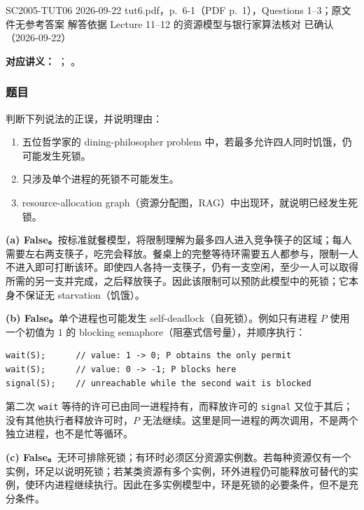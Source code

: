 
\label{tutorial:SC2005-TUT06}

\tutorialmeta
  {SC2005-TUT06}
  {2026-09-22}
  {tut6.pdf，p.~6-1（PDF p.~1），Questions 1--3；原文件无参考答案}
  {解答依据 Lecture 11--12 的资源模型与银行家算法核对}
  {已确认（2026-09-22）}


\textbf{对应讲义：}
；
。

\subsubsection*{题目}

判断下列说法的正误，并说明理由：
\begin{enumerate}[label=(\alph*)]
  \item 五位哲学家的 dining-philosopher problem 中，若最多允许四人同时饥饿，仍可能发生死锁。
  \item 只涉及单个进程的死锁不可能发生。
  \item resource-allocation graph（资源分配图，RAG）中出现环，就说明已经发生死锁。
\end{enumerate}

\begin{checkedsolution}
\nopagebreak[4]
\textbf{(a) False。}按标准就餐模型，将限制理解为最多四人进入竞争筷子的区域；每人需要左右两支筷子，吃完会释放。餐桌上的完整等待环需要五人都参与，限制一人不进入即可打断该环。即使四人各持一支筷子，仍有一支空闲，至少一人可以取得所需的另一支并完成，之后释放筷子。因此该限制可以预防此模型中的死锁；它本身不保证无 starvation（饥饿）。

\textbf{(b) False。}单个进程也可能发生 self-deadlock（自死锁）。例如只有进程 $P$ 使用一个初值为 $1$ 的 blocking semaphore（阻塞式信号量），并顺序执行：
\begin{verbatim}
wait(S);      // value: 1 -> 0; P obtains the only permit
wait(S);      // value: 0 -> -1; P blocks here
signal(S);    // unreachable while the second wait is blocked
\end{verbatim}
第二次 \texttt{wait} 等待的许可已由同一进程持有，而释放许可的 \texttt{signal} 又位于其后；没有其他执行者释放许可时，$P$ 无法继续。这里是同一进程的两次调用，不是两个独立进程，也不是忙等循环。

\textbf{(c) False。}无环可排除死锁；有环时必须区分资源实例数。若每种资源仅有一个实例，环足以说明死锁；若某类资源有多个实例，环外进程仍可能释放可替代的实例，使环内进程继续执行。因此在多实例模型中，环是死锁的必要条件，但不是充分条件。
\end{checkedsolution}

